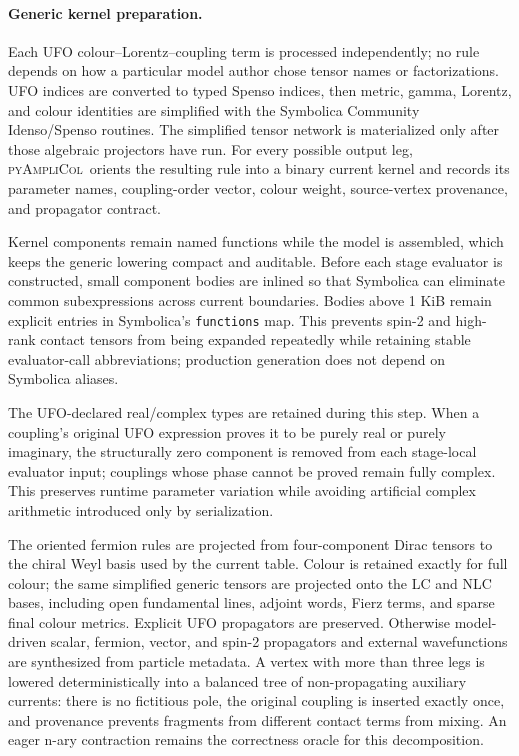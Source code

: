 \documentclass[10pt]{article}
\newcommand{\PAC}{\textsc{pyAmpliCol}}
\begin{document}
\paragraph{Generic kernel preparation.}
Each UFO colour--Lorentz--coupling term is processed independently; no rule
depends on how a particular model author chose tensor names or factorizations.
UFO indices are converted to typed Spenso indices, then metric, gamma, Lorentz,
and colour identities are simplified with the Symbolica Community
Idenso/Spenso routines.  The simplified tensor network is materialized only
after those algebraic projectors have run.  For every possible output leg,
\PAC\ orients the resulting rule into a binary current kernel and records its
parameter names, coupling-order vector, colour weight, source-vertex
provenance, and propagator contract.

Kernel components remain named functions while the model is assembled, which
keeps the generic lowering compact and auditable.  Before each stage evaluator
is constructed, small component bodies are inlined so that Symbolica can
eliminate common subexpressions across current boundaries.  Bodies above
1 KiB remain explicit entries in Symbolica's \texttt{functions} map.  This
prevents spin-2 and high-rank contact tensors from being expanded repeatedly
while retaining stable evaluator-call abbreviations; production generation
does not depend on Symbolica aliases.

The UFO-declared real/complex types are retained during this step.  When a
coupling's original UFO expression proves it to be purely real or purely
imaginary, the structurally zero component is removed from each stage-local
evaluator input; couplings whose phase cannot be proved remain fully complex.
This preserves runtime parameter variation while avoiding artificial complex
arithmetic introduced only by serialization.

The oriented fermion rules are projected from four-component Dirac tensors to
the chiral Weyl basis used by the current table.  Colour is retained exactly
for full colour; the same simplified generic tensors are projected onto the LC
and NLC bases, including open fundamental lines, adjoint words, Fierz terms,
and sparse final colour metrics.  Explicit UFO propagators are preserved.
Otherwise model-driven scalar, fermion, vector, and spin-2 propagators and
external wavefunctions are synthesized from particle metadata.  A vertex with
more than three legs is lowered deterministically into a balanced tree of
non-propagating auxiliary currents: there is no fictitious pole, the original
coupling is inserted exactly once, and provenance prevents fragments from
different contact terms from mixing.  An eager n-ary contraction remains the
correctness oracle for this decomposition.
\end{document}
